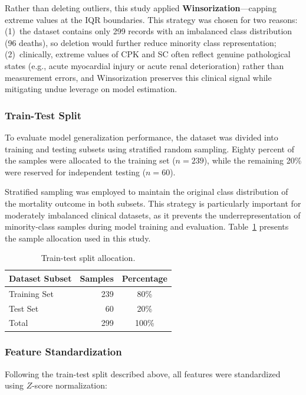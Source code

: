 \documentclass[12pt,a4paper]{article}
\begin{document}
Rather than deleting outliers, this study applied \textbf{Winsorization}---capping extreme values at the IQR boundaries. This strategy was chosen for two reasons: (1)~the dataset contains only 299 records with an imbalanced class distribution (96 deaths), so deletion would further reduce minority class representation; (2)~clinically, extreme values of CPK and SC often reflect genuine pathological states (e.g., acute myocardial injury or acute renal deterioration) rather than measurement errors, and Winsorization preserves this clinical signal while mitigating undue leverage on model estimation.

\subsubsection{Train-Test Split}

To evaluate model generalization performance, the dataset was divided into training and testing subsets using stratified random sampling. Eighty percent of the samples were allocated to the training set ($n = 239$), while the remaining 20\% were reserved for independent testing ($n = 60$).

Stratified sampling was employed to maintain the original class distribution of the mortality outcome in both subsets. This strategy is particularly important for moderately imbalanced clinical datasets, as it prevents the underrepresentation of minority-class samples during model training and evaluation. Table~\ref{tab:train_test_split} presents the sample allocation used in this study.

\begin{table}[H]
\centering
\caption{Train-test split allocation.}
\label{tab:train_test_split}
\begin{tabular}{lrc}
\toprule
\textbf{Dataset Subset} & \textbf{Samples} & \textbf{Percentage} \\
\midrule
Training Set & 239 & 80\% \\
Test Set     & 60  & 20\% \\
\midrule
Total        & 299 & 100\% \\
\bottomrule
\end{tabular}
\end{table}

\subsubsection{Feature Standardization}

Following the train-test split described above, all features were standardized using $Z$-score normalization:
\end{document}
